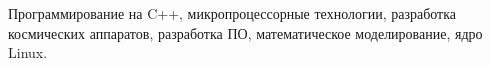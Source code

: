 
\nocite{*}


Программирование на C++, микропроцессорные технологии, разработка космических аппаратов, разработка ПО, математическое моделирование, ядро Linux.
